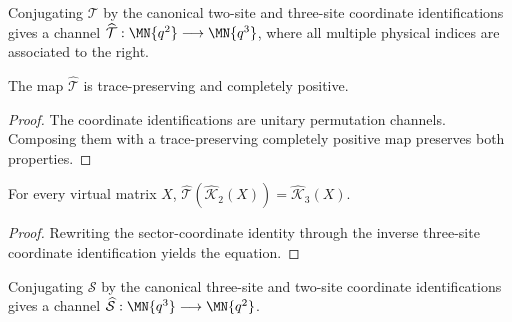 \begin{definition}
    \label{def:mpdo_physical_t_map}
    \leanok
    Conjugating $\mathcal T$ by the canonical two-site and three-site
    coordinate identifications gives a channel
    $\widehat{\mathcal T}:\MN{q^2}\longrightarrow\MN{q^3}$, where all
    multiple physical indices are associated to the right.
\end{definition}

\begin{lemma}
    \label{thm:mpdo_physical_t_map_cptp}
    \leanok
    The map $\widehat{\mathcal T}$ is trace-preserving and completely
    positive.
\end{lemma}

\begin{proof}\leanok
    The coordinate identifications are unitary permutation channels.
    Composing them with a trace-preserving completely positive map preserves
    both properties.
\end{proof}

\begin{lemma}
    \label{thm:mpdo_physical_t_closure_identity}
    \leanok
    For every virtual matrix $X$,
    $\widehat{\mathcal T}(\widehat{\mathcal K}_2(X))
        =\widehat{\mathcal K}_3(X)$.
\end{lemma}

\begin{proof}\leanok
    Rewriting the sector-coordinate identity through the inverse three-site
    coordinate identification yields the equation.
\end{proof}

\begin{definition}
    \label{def:mpdo_physical_s_map}
    \leanok
    Conjugating $\mathcal S$ by the canonical three-site and two-site
    coordinate identifications gives a channel
    $\widehat{\mathcal S}:\MN{q^3}\longrightarrow\MN{q^2}$.
\end{definition}

